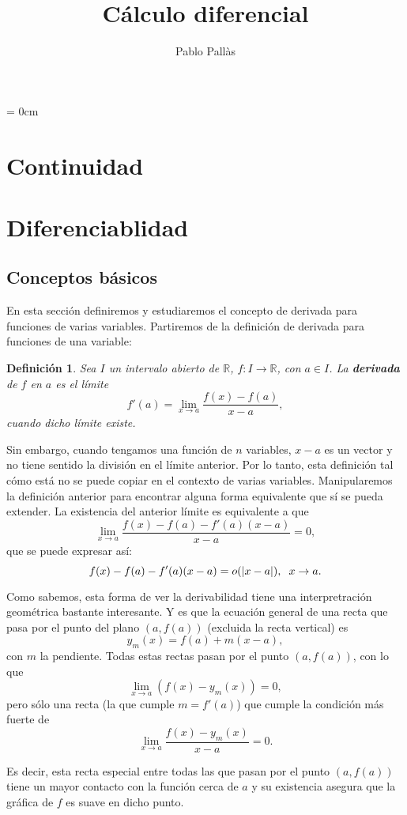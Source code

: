 \documentclass[12pt]{article}
\author{Pablo Pallàs}
\title{Cálculo diferencial}
\newtheorem{definition}[theorem]{Definición}
\providecommand{\abs}[1]{\lvert#1\rvert}
\begin{document}
\rmfamily
\maketitle
\tableofcontents
\parindent= 0cm

\section{Continuidad}
\section{Diferenciablidad}
\subsection{Conceptos básicos}
En esta sección definiremos y estudiaremos el concepto de derivada para funciones de varias variables. Partiremos de la definición de derivada para funciones de una variable:
\begin{definition} Sea $I$ un intervalo abierto de $\mathbb{R}$, $f \colon I \longrightarrow \mathbb{R}$, con $a \in I$. La \textbf{derivada} de $f$ en $a$ es el límite $$f'(a)= \lim_{x\rightarrow a}\dfrac{f(x)-f(a)}{x-a},$$ cuando dicho límite existe.
\end{definition}

Sin embargo, cuando tengamos una función de $n$ variables, $x-a$ es un vector y no tiene sentido la división en el límite anterior. Por lo tanto, esta definición tal cómo está no se puede copiar en el contexto de varias variables. Manipularemos la definición anterior para encontrar alguna forma equivalente que sí se pueda extender.
La existencia del anterior límite es equivalente a que $$\lim_{x\rightarrow a}\dfrac{f(x)-f(a)-f'(a)(x-a)}{x-a} = 0,$$ que se puede expresar así: $$f(x)-f(a)-f'(a)(x-a)=o(\abs{x-a}), \hspace{0.2cm} x\rightarrow a.$$

Como sabemos, esta forma de ver la derivabilidad tiene una interpretración geométrica bastante interesante. Y es que la ecuación general de una recta que pasa por el punto del plano $(a, f(a))$ (excluida la recta vertical) es $$y_m(x)=f(a)+m(x-a),$$ con $m$ la pendiente. Todas estas rectas pasan por el punto $(a,f(a))$, con lo que $$\lim_{x \rightarrow a}(f(x)-y_m(x))=0,$$ pero sólo una recta (la que cumple $m = f'(a)$) que cumple la condición más fuerte de $$\lim_{x\rightarrow a} \dfrac{f(x)-y_m(x)}{x-a} =0.$$

Es decir, esta recta especial entre todas las que pasan por el punto $(a,f(a))$ tiene un mayor contacto con la función cerca de $a$ y su existencia asegura que la gráfica de $f$ es suave en dicho punto.
\end{document}
